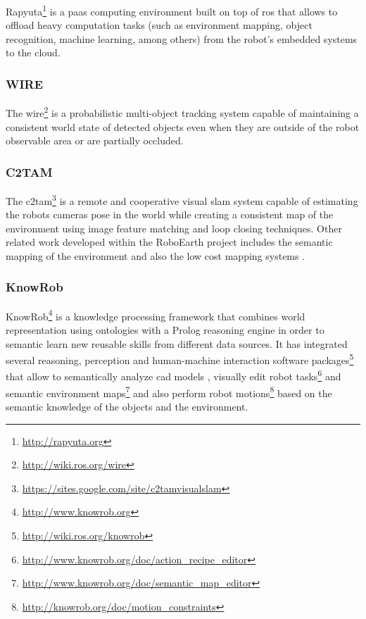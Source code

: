 Rapyuta\footnote{\url{http://rapyuta.org}} \cite{Hunziker2013} is a \gls{paas} computing environment built on top of \gls{ros} that allows to offload heavy computation tasks (such as environment mapping, object recognition, machine learning, among others) from the robot's embedded systems to the cloud.


\subsubsection{WIRE}

The \gls{wire}\footnote{\url{http://wiki.ros.org/wire}} \cite{Elfring2013} is a probabilistic multi-object tracking system capable of maintaining a consistent world state of detected objects even when they are outside of the robot observable area or are partially occluded.


\subsubsection{C2TAM}

The \gls{c2tam}\footnote{\url{https://sites.google.com/site/c2tamvisualslam}} \cite{Riazuelo2014} is a remote and cooperative visual \gls{slam} system capable of estimating the robots cameras pose in the world while creating a consistent map of the environment using image feature matching and loop closing techniques. Other related work developed within the RoboEarth project includes the semantic mapping of the environment \cite{Riazuelo2015} and also the low cost mapping systems \cite{Mohanarajah2015}.


\subsubsection{KnowRob}

KnowRob\footnote{\url{http://www.knowrob.org}} \cite{tenorth2011PhD,Tenorth2013k} is a knowledge processing framework that combines world representation using ontologies with a Prolog reasoning engine in order to semantic learn new reusable skills from different data sources. It has integrated several reasoning, perception and human-machine interaction software packages\footnote{\url{http://wiki.ros.org/knowrob}} that allow to semantically analyze \gls{cad} models \cite{Tenorth2013cad}, visually edit robot tasks\footnote{\url{http://www.knowrob.org/doc/action_recipe_editor}} and semantic environment maps\footnote{\url{http://www.knowrob.org/doc/semantic_map_editor}} \cite{Pangercic2012} and also perform robot motions\footnote{\url{http://knowrob.org/doc/motion_constraints}} \cite{tenorth14motiontemplates} based on the semantic knowledge of the objects and the environment.


